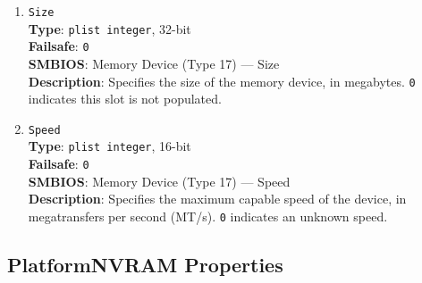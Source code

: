 \documentclass[]{article}
\begin{document}
\begin{enumerate}
\item
  \texttt{Size}\\
  \textbf{Type}: \texttt{plist\ integer}, 32-bit\\
  \textbf{Failsafe}: \texttt{0}\\
  \textbf{SMBIOS}: Memory Device (Type 17) --- Size\\
  \textbf{Description}: Specifies the size of the memory device, in megabytes.
  \texttt{0} indicates this slot is not populated.

\item
  \texttt{Speed}\\
  \textbf{Type}: \texttt{plist\ integer}, 16-bit\\
  \textbf{Failsafe}: \texttt{0}\\
  \textbf{SMBIOS}: Memory Device (Type 17) --- Speed\\
  \textbf{Description}: Specifies the maximum capable speed of the device,
  in megatransfers per second (MT/s). \texttt{0} indicates an unknown speed.

\end{enumerate}

\subsection{PlatformNVRAM Properties}\label{platforminfonvram}
\end{document}
